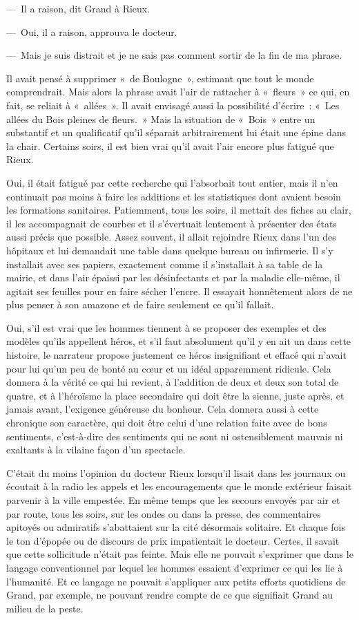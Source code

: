 \documentclass[french,twoside]{book} %
\begin{document}
— Il a raison, dit Grand à Rieux.\par
— Oui, il a raison, approuva le docteur.\par
— Mais je suis distrait et je ne sais pas comment sortir de la fin de ma phrase.\par
Il avait pensé à supprimer « de Boulogne », estimant que tout le monde comprendrait. Mais alors la phrase avait l’air de rattacher à « fleurs » ce qui, en fait, se reliait à « allées ». Il avait envisagé aussi la possibilité d’écrire : « Les allées du Bois pleines de fleurs. » Mais la situation de « Bois » entre un substantif et un qualificatif qu’il séparait arbitrairement lui était une épine dans la chair. Certains soirs, il est bien vrai qu’il avait l’air encore plus fatigué que Rieux.\par
Oui, il était fatigué par cette recherche qui l’absorbait tout entier, mais il n’en continuait pas moins à faire les additions et les statistiques dont avaient besoin les formations sanitaires. Patiemment, tous les soirs, il mettait des fiches au clair, il les accompagnait de courbes et il s’évertuait lentement à présenter des états aussi précis que possible. Assez souvent, il allait rejoindre Rieux dans l’un des hôpitaux et lui demandait une table dans quelque bureau ou infirmerie. Il s’y installait avec ses papiers, exactement comme il s’installait à sa table de la mairie, et dans l’air épaissi par les désinfectants et par la maladie elle-même, il agitait ses feuilles pour en faire sécher l’encre. Il essayait honnêtement alors de ne plus penser à son amazone et de faire seulement ce qu’il fallait.\par
Oui, s’il est vrai que les hommes tiennent à se proposer des exemples et des modèles qu’ils appellent héros, et s’il faut absolument qu’il y en ait un dans cette histoire, le narrateur propose justement ce héros insignifiant et effacé qui n’avait pour lui qu’un peu de bonté au cœur et un idéal apparemment ridicule. Cela donnera à la vérité ce qui lui revient, à l’addition de deux et deux son total de quatre, et à l’héroïsme la place secondaire qui doit être la sienne, juste après, et jamais avant, l’exigence généreuse du bonheur. Cela donnera aussi à cette chronique son caractère, qui doit être celui d’une relation faite avec de bons sentiments, c’est-à-dire des sentiments qui ne sont ni ostensiblement mauvais ni exaltants à la vilaine façon d’un spectacle.\par
C’était du moins l’opinion du docteur Rieux lorsqu’il lisait dans les journaux ou écoutait à la radio les appels et les encouragements que le monde extérieur faisait parvenir à la ville empestée. En même temps que les secours envoyés par air et par route, tous les soirs, sur les ondes ou dans la presse, des commentaires apitoyés ou admiratifs s’abattaient sur la cité désormais solitaire. Et chaque fois le ton d’épopée ou de discours de prix impatientait le docteur. Certes, il savait que cette sollicitude n’était pas feinte. Mais elle ne pouvait s’exprimer que dans le langage conventionnel par lequel les hommes essaient d’exprimer ce qui les lie à l’humanité. Et ce langage ne pouvait s’appliquer aux petits efforts quotidiens de Grand, par exemple, ne pouvant rendre compte de ce que signifiait Grand au milieu de la peste.\par
\end{document}
